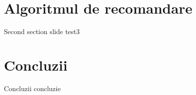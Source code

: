 \documentclass{beamer}
\begin{document}
\section{Algoritmul de recomandare}
\frame{\tableofcontents[currentsection]}
\begin{frame}{Second section slide}
    test3
\end{frame}

\section{Concluzii}
\frame{\tableofcontents[currentsection]}
\begin{frame}{Concluzii}
	concluzie
\end{frame}
\end{document}
